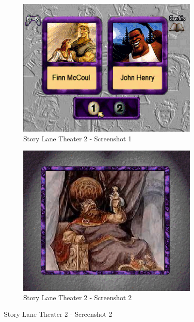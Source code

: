 \begin{figure}[H]
    \centering
    \begin{subfigure}{0.45\textwidth}
        \centering
        \includegraphics[width=\linewidth]{Games/StoryLaneTheater/Images/StoryLaneTheater2Image1.png}
        \caption{Story Lane Theater 2 - Screenshot 1}
    \end{subfigure}
    \begin{subfigure}{0.45\textwidth}
        \includegraphics[width=\linewidth]{Games/StoryLaneTheater/Images/StoryLaneTheater2Image2.png}
        \caption{Story Lane Theater 2 - Screenshot 2}
    \end{subfigure}


\end{figure}
